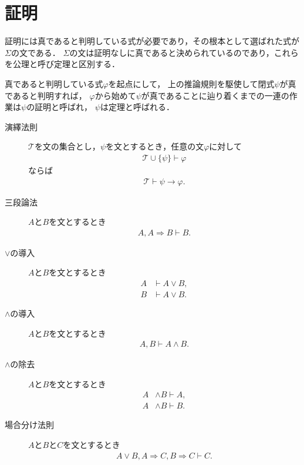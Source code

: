 \section{証明}
	
	証明には真であると判明している式が必要であり，その根本として選ばれた式が$\Sigma$の文である．
	$\Sigma$の文は証明なしに真であると決められているのであり，これらを公理と呼び定理と区別する．
	
	真であると判明している式$\varphi$を起点にして，
	上の推論規則を駆使して閉式$\psi$が真であると判明すれば，
	$\varphi$から始めて$\psi$が真であることに辿り着くまでの一連の作業は$\psi$の証明と呼ばれ，
	$\psi$は定理と呼ばれる．
	
	\begin{description}
		\item[演繹法則] $\mathscr{T}$を文の集合とし，$\psi$を文とするとき，任意の文$\varphi$に対して
			\begin{align}
				\mathscr{T} \cup \{\psi\} \vdash \varphi
			\end{align}
			ならば
			\begin{align}
				\mathscr{T} \vdash \psi \rightarrow \varphi.
			\end{align}
			
		\item[三段論法] $A$と$B$を文とするとき
			\begin{align}
				A,A \Longrightarrow B \vdash B.
			\end{align}
		
		\item[$\vee$の導入] $A$と$B$を文とするとき
			\begin{align}
				A &\vdash A \vee B, \\
				B &\vdash A \vee B.
			\end{align}
		
		\item[$\wedge$の導入] $A$と$B$を文とするとき
			\begin{align}
				A,B \vdash A \wedge B.
			\end{align}
		
		\item[$\wedge$の除去] $A$と$B$を文とするとき
			\begin{align}
				A &\wedge B \vdash A, \\
				A &\wedge B \vdash B.
			\end{align}
			
		\item[場合分け法則] $A$と$B$と$C$を文とするとき
			\begin{align}
				A \vee B, A \Longrightarrow C, B \Longrightarrow C \vdash C.
			\end{align}
	\end{description}
	
